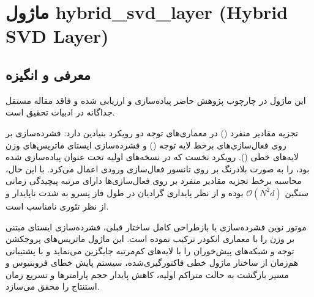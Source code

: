\section{ماژول hybrid\_svd\_layer (Hybrid SVD Layer)}
\label{sec:module_hybrid_svd_layer}

\subsection{معرفی و انگیزه}
این ماژول در چارچوب پژوهش حاضر پیاده‌سازی و ارزیابی شده و فاقد مقاله مستقل جداگانه در ادبیات تحقیق است.

تجزیه مقادیر منفرد () در معماری‌های توجه دو رویکرد بنیادین دارد: فشرده‌سازی بر روی فعال‌سازی‌های برخط لایه توجه () و فشرده‌سازی ایستای ماتریس‌های وزن لایه‌های خطی (). رویکرد نخست که در نسخه‌های اولیه تحت عنوان  پیاده‌سازی شده بود،  را به صورت بلادرنگ بر روی تانسور فعال‌سازی ورودی اعمال می‌کرد. با این حال، محاسبه برخط تجزیه مقادیر منفرد بر روی فعال‌سازی‌ها دارای مرتبه پیچیدگی زمانی سنگین $\mathcal{O}(N^2 d)$ بوده و از نظر پایداری گرادیان در طول فاز پسرو به شدت ناپایدار و از نظر تئوری نامناسب است.

موتور نوین فشرده‌سازی  با بازطراحی کامل ساختار قبلی، فشرده‌سازی ایستای مبتنی بر وزن را با معماری انکودر ترکیب نموده است. این ماژول ماتریس‌های پروجکشن توجه و شبکه‌های پیش‌خوران را با لایه‌های کم‌مرتبه  جایگزین می‌نماید و با پشتیبانی هم‌زمان از ساختار ماژول خطی فاکتورگیری‌شده، سیستم پایش خطای فروبنیوس و مسیر بازگشت به حالت متراکم اولیه، کاهش پایدار حجم پارامترها و تسریع زمان استنتاج را محقق می‌سازد.

